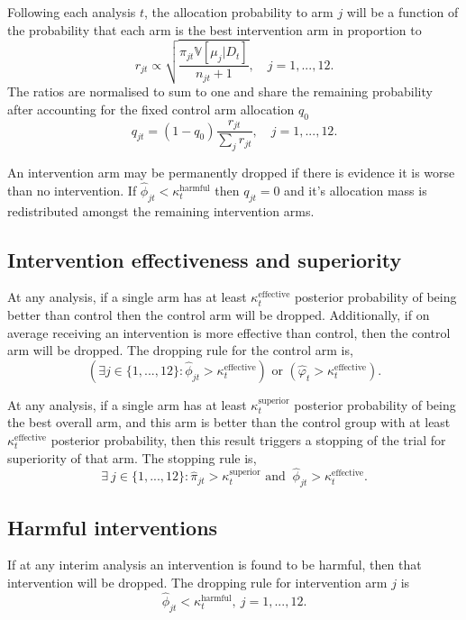 \documentclass[
  bibliography=totoc]{scrreprt}
\begin{document}
Following each analysis \(t\), the allocation probability to arm \(j\) will be a function of the probability that each arm is the best intervention arm in proportion to
\[
r_{jt} \propto \sqrt{\frac{\pi_{jt}\mathbb V[\mu_j|D_t]}{n_{jt} + 1}},\quad j=1,...,12.
\]
The ratios are normalised to sum to one and share the remaining probability after accounting for the fixed control arm allocation \(q_0\)
\[
q_{jt} = (1 - q_0)\frac{r_{jt}}{\sum_j r_{jt}},\quad j=1,...,12.
\]

An intervention arm may be permanently dropped if there is evidence it is worse than no intervention.
If \(\hat\phi_{jt}<\kappa_t^{\text{harmful}}\) then \(q_{jt}=0\) and it's allocation mass is redistributed amongst the remaining intervention arms.

\hypertarget{intervention-effectiveness-and-superiority}{%
\subsection{Intervention effectiveness and superiority}\label{intervention-effectiveness-and-superiority}}

At any analysis, if a single arm has at least \(\kappa_t^{\text{effective}}\) posterior probability of being better than control then the control arm will be dropped.
Additionally, if on average receiving an intervention is more effective than control, then the control arm will be dropped.
The dropping rule for the control arm is,
\[
\left(\exists j\in\{1,...,12\}:\hat\phi_{jt}>\kappa_t^{\text{effective}}\right)\text{ or } \left(\hat\varphi_t>\kappa_t^{\text{effective}}\right).
\]

At any analysis, if a single arm has at least \(\kappa_t^{\text{superior}}\) posterior probability of being the best overall arm, and this arm is better than the control group with at least \(\kappa_t^{\text{effective}}\) posterior probability, then this result triggers a stopping of the trial for superiority of that arm.
The stopping rule is,
\[
\exists \ j\in\{1,...,12\} : \hat\pi_{jt}>\kappa_t^{\text{superior}} \text{ and }\ \hat\phi_{jt}>\kappa_t^{\text{effective}}.
\]

\hypertarget{harmful-interventions}{%
\subsection{Harmful interventions}\label{harmful-interventions}}

If at any interim analysis an intervention is found to be harmful, then that intervention will be dropped.
The dropping rule for intervention arm \(j\) is
\[
\hat\phi_{jt}<\kappa_t^{\text{harmful}},\ j=1,...,12.
\]
\end{document}
